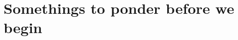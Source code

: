 \section{Somethings to ponder before we begin}
\label{act8.1.0}

\begin{fnt}
	
\end{fnt}

\WCD

%	
%

\begin{fnt}
	
\end{fnt}

\WCD